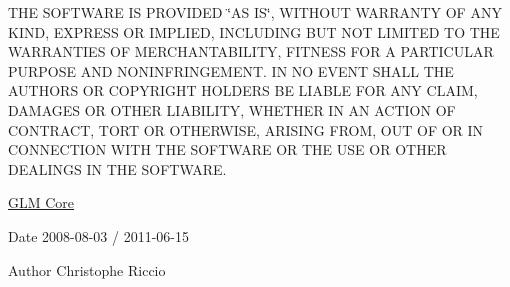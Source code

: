 \-T\-H\-E \-S\-O\-F\-T\-W\-A\-R\-E \-I\-S \-P\-R\-O\-V\-I\-D\-E\-D \char`\"{}\-A\-S I\-S\char`\"{}, \-W\-I\-T\-H\-O\-U\-T \-W\-A\-R\-R\-A\-N\-T\-Y \-O\-F \-A\-N\-Y \-K\-I\-N\-D, \-E\-X\-P\-R\-E\-S\-S \-O\-R \-I\-M\-P\-L\-I\-E\-D, \-I\-N\-C\-L\-U\-D\-I\-N\-G \-B\-U\-T \-N\-O\-T \-L\-I\-M\-I\-T\-E\-D \-T\-O \-T\-H\-E \-W\-A\-R\-R\-A\-N\-T\-I\-E\-S \-O\-F \-M\-E\-R\-C\-H\-A\-N\-T\-A\-B\-I\-L\-I\-T\-Y, \-F\-I\-T\-N\-E\-S\-S \-F\-O\-R \-A \-P\-A\-R\-T\-I\-C\-U\-L\-A\-R \-P\-U\-R\-P\-O\-S\-E \-A\-N\-D \-N\-O\-N\-I\-N\-F\-R\-I\-N\-G\-E\-M\-E\-N\-T. \-I\-N \-N\-O \-E\-V\-E\-N\-T \-S\-H\-A\-L\-L \-T\-H\-E \-A\-U\-T\-H\-O\-R\-S \-O\-R \-C\-O\-P\-Y\-R\-I\-G\-H\-T \-H\-O\-L\-D\-E\-R\-S \-B\-E \-L\-I\-A\-B\-L\-E \-F\-O\-R \-A\-N\-Y \-C\-L\-A\-I\-M, \-D\-A\-M\-A\-G\-E\-S \-O\-R \-O\-T\-H\-E\-R \-L\-I\-A\-B\-I\-L\-I\-T\-Y, \-W\-H\-E\-T\-H\-E\-R \-I\-N \-A\-N \-A\-C\-T\-I\-O\-N \-O\-F \-C\-O\-N\-T\-R\-A\-C\-T, \-T\-O\-R\-T \-O\-R \-O\-T\-H\-E\-R\-W\-I\-S\-E, \-A\-R\-I\-S\-I\-N\-G \-F\-R\-O\-M, \-O\-U\-T \-O\-F \-O\-R \-I\-N \-C\-O\-N\-N\-E\-C\-T\-I\-O\-N \-W\-I\-T\-H \-T\-H\-E \-S\-O\-F\-T\-W\-A\-R\-E \-O\-R \-T\-H\-E \-U\-S\-E \-O\-R \-O\-T\-H\-E\-R \-D\-E\-A\-L\-I\-N\-G\-S \-I\-N \-T\-H\-E \-S\-O\-F\-T\-W\-A\-R\-E.

\hyperlink{group__core}{\-G\-L\-M \-Core}

\begin{DoxyDate}{\-Date}
2008-\/08-\/03 / 2011-\/06-\/15 
\end{DoxyDate}
\begin{DoxyAuthor}{\-Author}
\-Christophe \-Riccio 
\end{DoxyAuthor}

